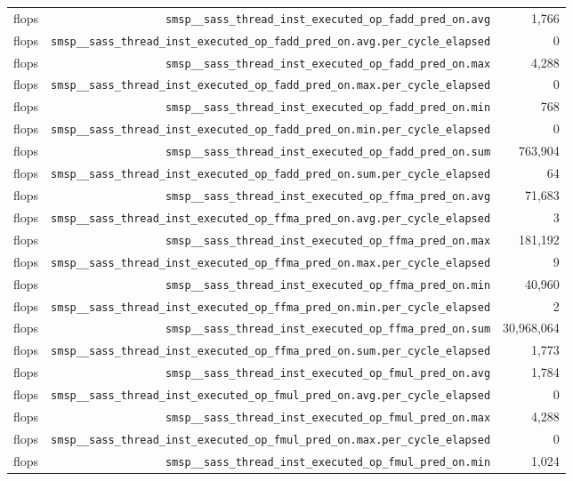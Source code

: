 \begin{table}[h]
\begin{tabular}{|l|r|r|}
flops & \texttt{smsp__sass_thread_inst_executed_op_fadd_pred_on.avg} & 1,766 \\
flops & \texttt{smsp__sass_thread_inst_executed_op_fadd_pred_on.avg.per_cycle_elapsed} & 0 \\
flops & \texttt{smsp__sass_thread_inst_executed_op_fadd_pred_on.max} & 4,288 \\
flops & \texttt{smsp__sass_thread_inst_executed_op_fadd_pred_on.max.per_cycle_elapsed} & 0 \\
flops & \texttt{smsp__sass_thread_inst_executed_op_fadd_pred_on.min} & 768 \\
flops & \texttt{smsp__sass_thread_inst_executed_op_fadd_pred_on.min.per_cycle_elapsed} & 0 \\
flops & \texttt{smsp__sass_thread_inst_executed_op_fadd_pred_on.sum} & 763,904 \\
flops & \texttt{smsp__sass_thread_inst_executed_op_fadd_pred_on.sum.per_cycle_elapsed} & 64 \\
flops & \texttt{smsp__sass_thread_inst_executed_op_ffma_pred_on.avg} & 71,683 \\
flops & \texttt{smsp__sass_thread_inst_executed_op_ffma_pred_on.avg.per_cycle_elapsed} & 3 \\
flops & \texttt{smsp__sass_thread_inst_executed_op_ffma_pred_on.max} & 181,192 \\
flops & \texttt{smsp__sass_thread_inst_executed_op_ffma_pred_on.max.per_cycle_elapsed} & 9 \\
flops & \texttt{smsp__sass_thread_inst_executed_op_ffma_pred_on.min} & 40,960 \\
flops & \texttt{smsp__sass_thread_inst_executed_op_ffma_pred_on.min.per_cycle_elapsed} & 2 \\
flops & \texttt{smsp__sass_thread_inst_executed_op_ffma_pred_on.sum} & 30,968,064 \\
flops & \texttt{smsp__sass_thread_inst_executed_op_ffma_pred_on.sum.per_cycle_elapsed} & 1,773 \\
flops & \texttt{smsp__sass_thread_inst_executed_op_fmul_pred_on.avg} & 1,784 \\
flops & \texttt{smsp__sass_thread_inst_executed_op_fmul_pred_on.avg.per_cycle_elapsed} & 0 \\
flops & \texttt{smsp__sass_thread_inst_executed_op_fmul_pred_on.max} & 4,288 \\
flops & \texttt{smsp__sass_thread_inst_executed_op_fmul_pred_on.max.per_cycle_elapsed} & 0 \\
flops & \texttt{smsp__sass_thread_inst_executed_op_fmul_pred_on.min} & 1,024 \\

\end{tabular}
\end{table}
